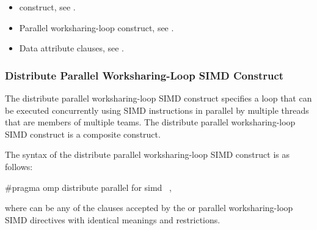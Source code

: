\crossreferences
\begin{itemize}
\item {} construct, see
.

\item Parallel worksharing-loop construct, see
.

\item Data attribute clauses, see
.
\end{itemize}



\subsubsection{Distribute Parallel Worksharing-Loop SIMD Construct}
\label{subsec:Distribute Parallel Worksharing-Loop SIMD Construct}
\summary
The distribute parallel worksharing-loop SIMD construct specifies a loop that 
can be executed concurrently using SIMD instructions in parallel by multiple 
threads that are members of multiple teams. The distribute parallel 
worksharing-loop SIMD construct is a composite construct.

\syntax
\begin{ccppspecific}
The syntax of the distribute parallel worksharing-loop SIMD construct is as follows:

\begin{ompcPragma}
#pragma omp distribute parallel for simd \
            \plc{[clause[ [},\plc{] clause] ... ] newline}
\end{ompcPragma}

where  can be any of the clauses accepted by the  
or parallel worksharing-loop SIMD directives with identical meanings and restrictions.
\end{ccppspecific}

